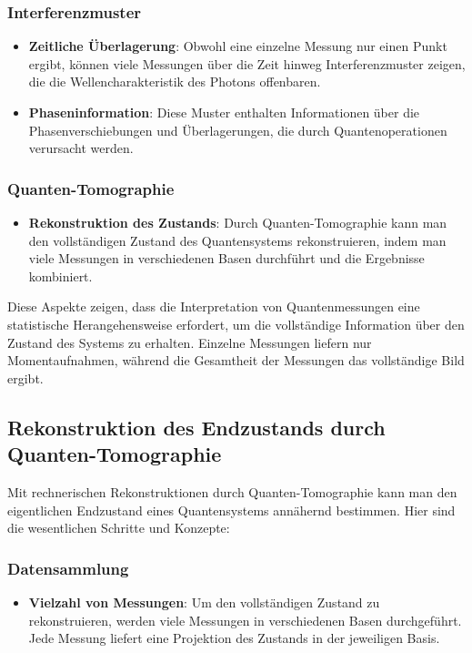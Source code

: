 \documentclass[12pt,a4paper]{article}
\begin{document}
	\subsubsection{Interferenzmuster}
	\begin{itemize}
		\item \textbf{Zeitliche Überlagerung}: Obwohl eine einzelne Messung nur einen Punkt ergibt, können viele Messungen über die Zeit hinweg Interferenzmuster zeigen, die die Wellencharakteristik des Photons offenbaren.
		\item \textbf{Phaseninformation}: Diese Muster enthalten Informationen über die Phasenverschiebungen und Überlagerungen, die durch Quantenoperationen verursacht werden.
	\end{itemize}
	
	\subsubsection{Quanten-Tomographie}
	\begin{itemize}
		\item \textbf{Rekonstruktion des Zustands}: Durch Quanten-Tomographie kann man den vollständigen Zustand des Quantensystems rekonstruieren, indem man viele Messungen in verschiedenen Basen durchführt und die Ergebnisse kombiniert.
	\end{itemize}
	
	Diese Aspekte zeigen, dass die Interpretation von Quantenmessungen eine statistische Herangehensweise erfordert, um die vollständige Information über den Zustand des Systems zu erhalten. Einzelne Messungen liefern nur Momentaufnahmen, während die Gesamtheit der Messungen das vollständige Bild ergibt.
	
	
	\subsection{Rekonstruktion des Endzustands durch Quanten-Tomographie}
	
	Mit rechnerischen Rekonstruktionen durch Quanten-Tomographie kann man den eigentlichen Endzustand eines Quantensystems annähernd bestimmen. Hier sind die wesentlichen Schritte und Konzepte:
	
	\subsubsection{Datensammlung}
	\begin{itemize}
		\item \textbf{Vielzahl von Messungen}: Um den vollständigen Zustand zu rekonstruieren, werden viele Messungen in verschiedenen Basen durchgeführt. Jede Messung liefert eine Projektion des Zustands in der jeweiligen Basis.
	\end{itemize}
	
\end{document}

